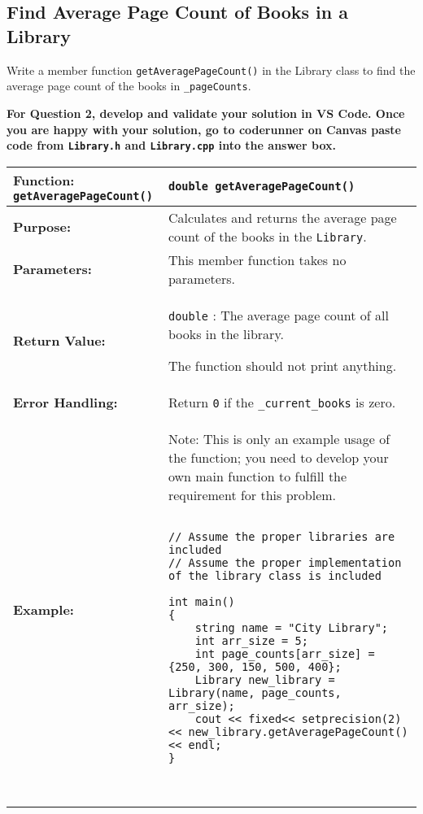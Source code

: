 \subsection{Find Average Page Count of Books in a Library}

Write a member function \texttt{getAveragePageCount()} in the Library class to find the average page count of the books in \texttt{_pageCounts}.

\textbf{For Question 2, develop and validate your solution in VS Code. Once you are happy with your solution, go to coderunner on Canvas paste code from \texttt{Library.h} and \texttt{Library.cpp} into the answer box.} 

\renewcommand{\arraystretch}{1.5}
\begin{longtable}{|p{1.7in}|p{4.3in}|}
\hline
\textbf{Function:} \texttt{getAveragePageCount()} & \texttt{double getAveragePageCount()} \\ \hline

\textbf{Purpose:} & Calculates and returns the average page count of the books in the \texttt{Library}. \\ \hline

\textbf{Parameters:} & 
This member function takes no parameters. \\ \hline

\textbf{Return Value:} & \texttt{double} : The average page count of all books in the library.

The function should not print anything. \\ \hline

\textbf{Error Handling:} & 
Return \texttt{0} if the \texttt{_current_books} is zero. \\ \hline

\textbf{Example:} & 

\begin{example}

Note: This is only an example usage of the function; you need to develop your own main function to fulfill the requirement for this problem.

\begin{verbatim}

// Assume the proper libraries are included
// Assume the proper implementation of the library class is included

int main()
{
    string name = "City Library";
    int arr_size = 5;
    int page_counts[arr_size] = {250, 300, 150, 500, 400};
    Library new_library = Library(name, page_counts, arr_size);
    cout << fixed<< setprecision(2) << new_library.getAveragePageCount() << endl;
}



\end{verbatim}
\end{example}
\end{longtable}
